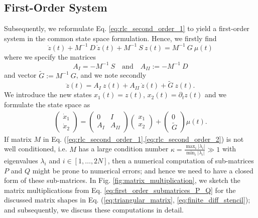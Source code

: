 \documentclass[a4paper, 10pt, twoside, twocolumn]{scrartcl}
\begin{document}
\subsection{First-Order System}
Subsequently, we reformulate Eq. \eqref{eq:rlc_second_order_1} to yield a first-order system in the common state space formulation. Hence, we firstly find
\begin{equation}
	\ddot{z}(t) + M^{-1}~D ~ \dot{z}(t) + M^{-1}~S ~ z(t) = M^{-1}~G ~ \mu(t)	 \label{eq:rlc_second_order_2}
\end{equation}
where we specify the matrices 
\begin{equation}
A_{I} = -M^{-1}~S \quad \text{and} \quad A_{II} := -M^{-1}~D	\label{eq:first_order_submatrices_P_Q}
\end{equation}
and vector $\tilde{G}:= M^{-1}~G$, and we note secondly 
\begin{equation*}
	\ddot{z}(t) = A_{I} ~ z(t)  + A_{II} ~ \dot{z}(t) + \tilde{G} ~ z(t) \text{.}
\end{equation*}
We introduce the new states $x_{1}(t) = z(t)$, $x_{2}(t) = \partial_{t} z(t)$ and we formulate the state space as 
\begin{align}
	\begin{pmatrix}
	\dot{x}_{1} \\	
	\dot{x}_{2}
	\end{pmatrix}
	=
	\begin{pmatrix}
		0 & I \\
		A_{I} & A_{II}
	\end{pmatrix}
	\begin{pmatrix}
		{x}_{1} \\	
		{x}_{2}
	\end{pmatrix}
	+
	\begin{pmatrix}
		0  \\
		\tilde{G}
	\end{pmatrix}
	\mu(t)\text{.}
\end{align}
If matrix $M$ in Eq. (\ref{eq:rlc_second_order_1},\ref{eq:rlc_second_order_2}) is not well conditioned, i.e. $M$ has a large condition number $\kappa = \frac{\max_{i} |\lambda_{i}|}{\min_{i} |\lambda_{i}|} \gg 1$ with eigenvalues $\lambda_{i}$ and $i \in [1,\ldots,2N]$, then a numerical computation of sub-matrices $P$ and $Q$ might be prone to numerical errors; and hence we need to have a closed form of these sub-matrices. In Fig. \ref{fig:matrix_multiplication}, we sketch the matrix multiplications from Eq. \eqref{eq:first_order_submatrices_P_Q} for the discussed matrix shapes in Eq. (\ref{eq:triangular_matrix}, \ref{eq:finite_diff_stencil}); and subsequently, we discuss these computations in detail. 
\end{document}
